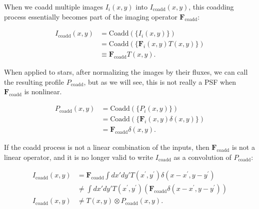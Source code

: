 \documentclass{aastex63}
\begin{document}
When we coadd multiple images $I_i(x,y)$ into $I_\mathrm{coadd}(x,y)$, this coadding process
essentially becomes part of the imaging operator $\mathbf{F}_\mathrm{coadd}$:
\begin{linenomath}\begin{align}
    I_\mathrm{coadd}(x,y) &= \mathrm{Coadd} \left( \{ I_i(x,y) \} \right) \nonumber\\
    &= \mathrm{Coadd} \left( \{ \mathbf{F}_i(x,y) T(x,y) \} \right) \nonumber\\
    &\equiv \mathbf{F}_\mathrm{coadd} T(x,y).
\end{align}\end{linenomath}
When applied to stars, after normalizing the images by their fluxes,
we can call the resulting profile $P_\mathrm{coadd}$, but as we will see, this is
not really a PSF when $\mathbf{F}_\mathrm{coadd}$ is nonlinear.
\begin{linenomath}\begin{align}
    P_\mathrm{coadd}(x,y) &= \mathrm{Coadd} \left( \{ P_i(x,y) \} \right) \nonumber\\
    &= \mathrm{Coadd} \left( \{ \mathbf{F}_i(x,y) \delta(x,y) \} \right) \nonumber\\
    &= \mathbf{F}_\mathrm{coadd} \delta(x,y).
\end{align}\end{linenomath}
If the coadd process is not a linear combination of the inputs, 
then $\mathbf{F}_\mathrm{coadd}$ is not a linear operator, and it is no longer valid to
write $I_\mathrm{coadd}$ as a convolution of $P_\mathrm{coadd}$:
\begin{linenomath}\begin{align}
    I_\mathrm{coadd}(x,y) &= \mathbf{F}_\mathrm{coadd} \int dx' dy' T(x^\prime,y^\prime) \delta(x-x^\prime,y-y^\prime) \nonumber\\
    &\ne \int dx' dy' T(x^\prime,y^\prime) \left( \mathbf{F}_\mathrm{coadd} \delta(x-x^\prime,y-y^\prime) \right) \nonumber\\
    I_\mathrm{coadd}(x,y) &\ne T(x,y) \otimes P_\mathrm{coadd}(x,y).
\end{align}\end{linenomath}
\end{document}
